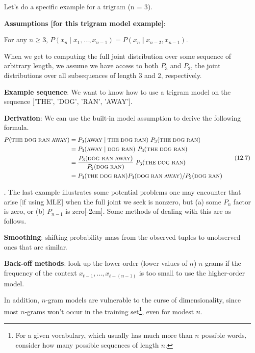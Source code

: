 \documentclass[11pt]{article}
\newcommand\myspace[1][]{\vspace{#1\bigskipamount}}
\newcommand\p{\Needspace{10\baselineskip} \noindent}
\newcommand\tlab[1]{\tag{#1}\label{#1}}
\begin{document}
\p Let's do a specific example for a trigram (n = 3). 
\begin{compactitem}
	\item \textbf{Assumptions [for this trigram model example]}:
	\begin{compactitem}
		\item For any $n \ge 3$, $P(x_n \mid x_1, \ldots, x_{n - 1}) = P(x_n \mid x_{n - 2}, x_{n - 1})$. 
		
		\item When we get to computing the full joint distribution over some sequence of arbitrary length, we assume we have access to both $P_3$ and $P_2$, the joint distributions over all subsequences of length 3 and 2, respectively. 
	\end{compactitem}
	
	\item \textbf{Example sequence}: We want to know how to use a trigram model on the sequence ['THE', 'DOG', 'RAN', 'AWAY']. 
	
	\item \textbf{Derivation}: We can use the built-in model assumption to derive the following formula.
	\newcommand\fml[1]{\text{\footnotesize#1}}
	\begin{align}
	\begin{split}
		P(\fml{THE DOG RAN AWAY})
			&= P_3(\fml{AWAY} \mid \fml{THE DOG RAN})  ~ P_3(\fml{THE DOG RAN})\\
			&=  P_3(\fml{AWAY} \mid \fml{DOG RAN})  ~ P_3(\fml{THE DOG RAN})\\
			&= \frac{ P_3(\fml{DOG RAN AWAY}) }{ P_2(\fml{DOG RAN}) }  ~ P_3(\fml{THE DOG RAN})\\
			&= P_3(\fml{THE DOG RAN}) P_3(\fml{DOG RAN AWAY}) / P_2(\fml{DOG RAN})
	\end{split}\tlab{12.7}
	\end{align}
\end{compactitem}
\myspace
\p {}. The last example illustrates some potential problems one may encounter that arise [if using MLE] when the full joint we seek is nonzero, but (a) some $P_n$ factor is zero, or (b) $P_{n - 1}$ is zero[-2em]. Some methods of dealing with this are as follows.
\begin{compactitem}
	\item \textbf{Smoothing}: shifting probability mass from the observed tuples to unobserved ones that are similar.
	\item \textbf{Back-off methods}: look up the lower-order (lower values of $n$) $n$-grams if the frequency of the context $x_{t - 1}, \ldots, x_{t - (n - 1)}$ is too small to use the higher-order model.
\end{compactitem}
In addition, $n$-gram models are vulnerable to the curse of dimensionality, since most $n$-grams won't occur in the training set\footnote{For a given vocabulary, which usually has much more than $n$ possible words, consider how many possible sequences of length $n$.}, even for modest $n$.
\end{document}
